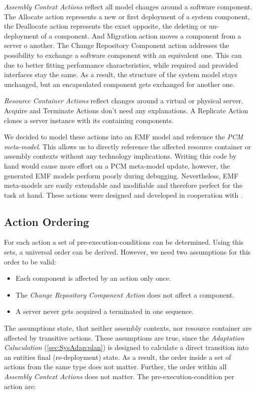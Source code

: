 \textit{Assembly Context Actions} reflect all model changes around a software component. The Allocate action represents a new or first deployment of a system component, the Deallocate action represents the exact opposite, the deleting or un-deployment of a component. And Migration action moves a component from a server o another. The Change Repository Component action addresses the possibility to exchange a software component with an equivalent one. This can due to better fitting performance characteristics, while required and provided interfaces stay the same. As a result, the structure of the system model stays unchanged, but an encapsulated component gets exchanged for another one.

\textit{Resource Container Actions} reflect changes around a virtual or physical server. Acquire and Terminate Actions don't need any explanations. A Replicate Action clones a server instance with its containing components.

We decided to model these actions into an EMF model and reference the \textit{PCM meta-model}. This allows us to directly reference the affected resource container or assembly contexts without any technology implications. Writing this code by hand would cause more effort on a PCM meta-model update, however, the generated EMF models perform poorly during debugging. Nevertheless, EMF meta-models are easily extendable and modifiable and therefore perfect for the task at hand. These actions were designed and developed in cooperation with \cite{TobiasPoppke.20170626}.

\subsection{Action Ordering}

For each action a set of pre-execution-conditions can be determined. Using this sets, a universal order can be derived. However, we need two assumptions for this order to be valid:
\begin{itemize}
	\setlength\itemsep{0em}
	\item Each component is affected by an action only once. 
	\item The \textit{Change Repository Component Action} does not affect a component.
	\item A server never gets acquired a terminated in one sequence.
\end{itemize}

The assumptions state, that neither assembly contexts, nor resource container are affected by transitive actions. These assumptions are true, since the \textit{Adaptation Caluculation} (\autoref{sec:SysAdap:plan}) is designed to calculate a direct transition into an entities final (re-deployment) state. As a result, the order inside a set of actions from the same type does not matter. Further, the order within all \textit{Assembly Context Actions} does not matter. The pre-execution-condition per action are:

